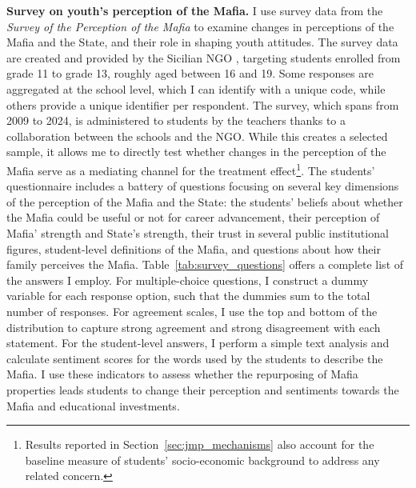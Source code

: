 \documentclass[12pt]{article}
\theoremstyle{plain}
\theoremstyle{plain}
\theoremstyle{plain}
\theoremstyle{definition}
\theoremstyle{plain}
\theoremstyle{definition}
\theoremstyle{plain}
\theoremstyle{remark}
\theoremstyle{definition}
\theoremstyle{definition}
\theoremstyle{plain}
\begin{document}
  \vspace{1cm}
\textbf{Survey on youth's perception of the Mafia.}
I use survey data from the \emph{Survey of the Perception of the Mafia} to examine changes in perceptions of the Mafia and the State, and their role in shaping youth attitudes. The survey data are created and provided by the Sicilian NGO \citet{centro_studi_pio_la_torre_survey_2025}, targeting students enrolled from grade 11 to grade 13, roughly aged between 16 and 19. Some responses are aggregated at the school level, which I can identify with a unique code, while others provide a unique identifier per respondent. The survey, which spans from 2009 to 2024, is administered to students by the teachers thanks to a collaboration between the schools and the NGO. While this creates a selected sample, it allows me to directly test whether changes in the perception of the Mafia serve as a mediating channel for the treatment effect\footnote{Results reported in Section~\ref{sec:jmp_mechanisms} also account for the baseline measure of students' socio-economic background to address any related concern.}.
The students' questionnaire includes a battery of questions focusing on several key dimensions of the perception of the Mafia and the State: the students' beliefs about whether the Mafia could be useful or not for career advancement, their perception of Mafia' strength and State's strength, their trust in several public institutional figures, student-level definitions of the Mafia, and questions about how their family perceives the Mafia.
Table~\ref{tab:survey_questions} offers a complete list of the answers I employ. For multiple-choice questions, I construct a dummy variable for each response option, such that the dummies sum to the total number of responses. For agreement scales, I use the top and bottom of the distribution to capture strong agreement and strong disagreement with each statement. For the student-level answers, I perform a simple text analysis and calculate sentiment scores for the words used by the students to describe the Mafia. I use these indicators to assess whether the repurposing of Mafia properties leads students to change their perception and sentiments towards the Mafia and educational investments.  
\vspace{1cm}
\end{document}
